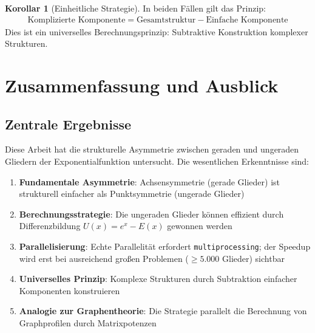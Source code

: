 ﻿\documentclass[a4paper,12pt]{article}
\theoremstyle{definition}
\newtheorem{korollar}{Korollar}
\begin{document}
\begin{korollar}[Einheitliche Strategie]
In beiden Fällen gilt das Prinzip:
\begin{align}
  \text{Komplizierte Komponente}
    = \text{Gesamtstruktur} - \text{Einfache Komponente}
\end{align}
Dies ist ein universelles Berechnungsprinzip:
Subtraktive Konstruktion komplexer Strukturen.
\end{korollar}

\section{Zusammenfassung und Ausblick}

\subsection{Zentrale Ergebnisse}

Diese Arbeit hat die strukturelle Asymmetrie zwischen geraden und ungeraden
Gliedern der Exponentialfunktion untersucht. Die wesentlichen Erkenntnisse
sind:

\begin{enumerate}
  \item \textbf{Fundamentale Asymmetrie}: Achsensymmetrie (gerade Glieder)
        ist strukturell einfacher als Punktsymmetrie (ungerade Glieder)
  \item \textbf{Berechnungsstrategie}: Die ungeraden Glieder können effizient
        durch Differenzbildung $U(x) = e^x - E(x)$ gewonnen werden
  \item \textbf{Parallelisierung}: Echte Parallelität erfordert
        \texttt{multiprocessing}; der Speedup wird erst bei ausreichend
        großen Problemen ($\geq 5.000$ Glieder) sichtbar
  \item \textbf{Universelles Prinzip}: Komplexe Strukturen durch Subtraktion
        einfacher Komponenten konstruieren
  \item \textbf{Analogie zur Graphentheorie}: Die Strategie parallelt die
        Berechnung von Graphprofilen durch Matrixpotenzen
\end{enumerate}
\end{document}
